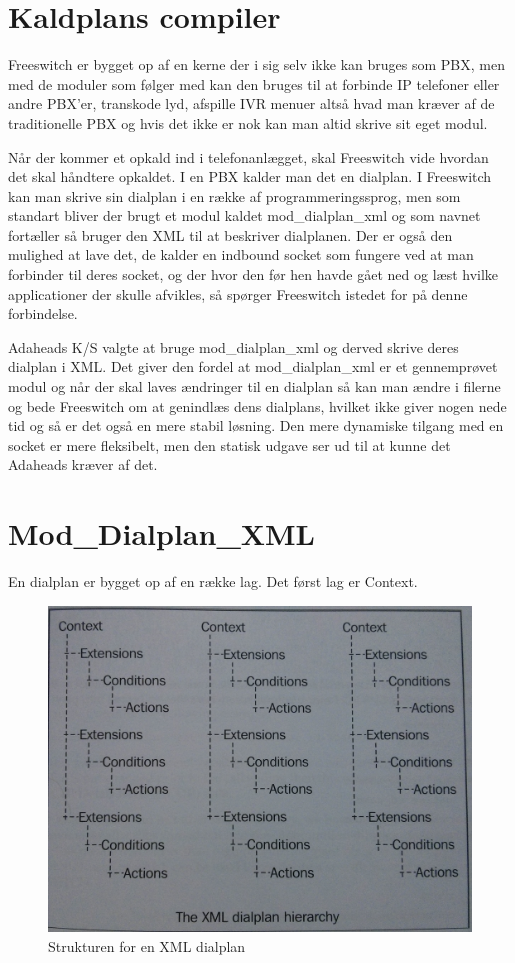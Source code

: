 \section{Kaldplans compiler}
Freeswitch er bygget op af en kerne der i sig selv ikke kan bruges som PBX, men med de moduler som følger med kan den bruges til at forbinde IP telefoner eller andre PBX'er, transkode lyd, afspille IVR menuer altså hvad man kræver af de traditionelle PBX og hvis det ikke er nok kan man altid skrive sit eget modul.

Når der kommer et opkald ind i telefonanlægget, skal Freeswitch vide hvordan det skal håndtere opkaldet. I en PBX kalder man det en dialplan.  
I Freeswitch kan man skrive sin dialplan i en række af programmeringssprog, men som standart bliver der brugt et modul kaldet mod\_dialplan\_xml og som navnet fortæller så bruger den XML til at beskriver dialplanen. Der er også den mulighed at lave det, de kalder en indbound socket som fungere ved at man forbinder til deres socket, og der hvor den før hen havde gået ned og læst hvilke applicationer der skulle afvikles, så spørger Freeswitch istedet for på denne forbindelse. 

Adaheads K/S valgte at bruge mod\_dialplan\_xml og derved skrive deres dialplan i XML. Det giver den fordel at mod\_dialplan\_xml er et gennemprøvet modul og når der skal laves ændringer til en dialplan så kan man ændre i filerne og bede Freeswitch om at genindlæs dens dialplans, hvilket ikke giver nogen nede tid og så er det også en mere stabil løsning. Den mere dynamiske tilgang med en socket er mere fleksibelt, men den statisk udgave ser ud til at kunne det Adaheads kræver af det.

\section{Mod\_Dialplan\_XML}
En dialplan er bygget op af en række lag. Det først lag er Context. 
\begin{figure}[ht!]
\centering
\includegraphics[scale=0.12]{images/dialplanstructure.jpg}
\caption{Strukturen for en XML dialplan\citep{freeswitch12}}
\label{fig:xmldialplan}
\end{figure}

